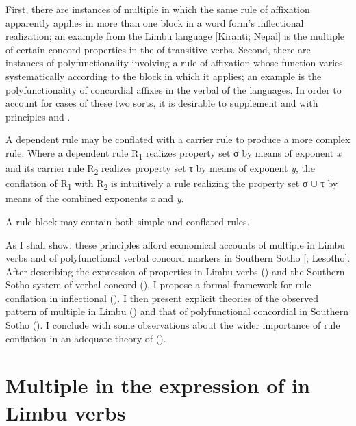\documentclass[output=paper,
modfonts
]{LSP/langsci}
\begin{document}
First, there are instances of multiple  in which the same rule of affixation apparently applies in more than one block in a word form’s inflectional realization; an example from the Limbu language [Kiranti; Nepal] is the multiple  of certain  concord properties in the  of transitive verbs.  Second, there are instances of polyfunctionality involving a rule of affixation whose function varies systematically according to the block in which it applies; an example is the polyfunctionality of concordial affixes in the verbal  of the  languages.  In order to account for cases of these two sorts, it is desirable to supplement  and  with principles  and .

\ea%
    \label{ex:stump:3}
 A dependent rule may be conflated with a carrier rule to produce a more complex rule.  Where a dependent rule R\textsubscript{1} realizes property set σ by means of exponent \textit{x} and its carrier rule R\textsubscript{2} realizes property set τ by means of exponent \textit{y}, the conflation of R\textsubscript{1} with R\textsubscript{2} is intuitively a rule realizing the property set σ ${\cup}$ τ by means of the combined exponents \textit{x} and \textit{y}.
\z

\ea%
    \label{ex:stump:4}
   A rule block may contain both simple and conflated rules.
\z

  As I shall show, these principles afford economical accounts of multiple  in Limbu verbs and of polyfunctional verbal concord markers in Southern Sotho [; Lesotho].  After describing the expression of  properties in Limbu verbs () and the Southern Sotho system of verbal concord (), I propose a formal framework for rule conflation in inflectional  ().  I then present explicit theories of the observed pattern of multiple  in Limbu () and that of polyfunctional concordial  in Southern Sotho ().  I conclude with some observations about the wider importance of rule conflation in an adequate theory of  ().

\section{Multiple  in the expression of   in Limbu verbs}\label{sec:stump:2}
\end{document}
